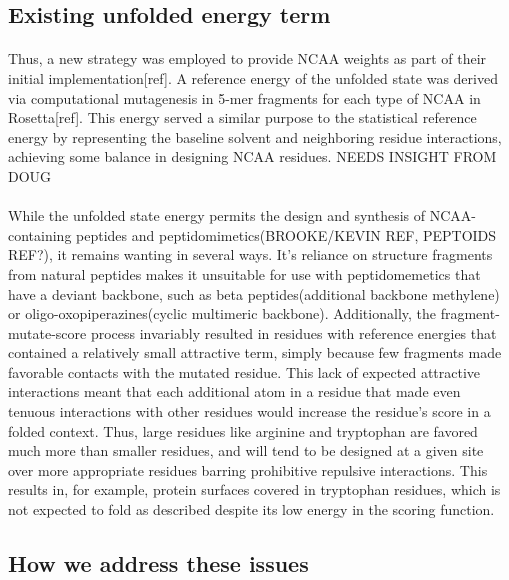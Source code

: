 \subsection{Existing unfolded energy term}

\paragraph{}
Thus, a new strategy was employed to provide NCAA weights as part of their initial implementation[ref]. A reference energy of the unfolded state was derived via computational mutagenesis in 5-mer fragments for each type of NCAA in Rosetta[ref]. This energy served a similar purpose to the statistical reference energy by representing the baseline solvent and neighboring residue interactions, achieving some balance in designing NCAA residues. NEEDS INSIGHT FROM DOUG

\paragraph{}
While the unfolded state energy permits the design and synthesis of NCAA-containing peptides and peptidomimetics(BROOKE/KEVIN REF, PEPTOIDS REF?), it remains wanting in several ways. It's reliance on structure fragments from natural peptides makes it unsuitable for use with peptidomemetics that have a deviant backbone, such as beta peptides(additional backbone methylene) or oligo-oxopiperazines(cyclic multimeric backbone). Additionally, the fragment-mutate-score process invariably resulted in residues with reference energies that contained a relatively small attractive term, simply because few fragments made favorable contacts with the mutated residue. This lack of expected attractive interactions meant that each additional atom in a residue that made even tenuous interactions with other residues would increase the residue's score in a folded context. Thus, large residues like arginine and tryptophan are favored much more than smaller residues, and will tend to be designed at a given site over more appropriate residues barring prohibitive repulsive interactions. This results in, for example, protein surfaces covered in tryptophan residues, which is not expected to fold as described despite its low energy in the scoring function.

\subsection{How we address these issues}
